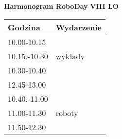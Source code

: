 \documentclass{article}
\begin{document}
\begin{center}
\Large\textbf{Harmonogram RoboDay}
\large\textbf{VIII LO}
\end{center}
\vspace{1cm}
\begin{center}
\begin{tabular}{|l|l|}
\hline
\textbf{Godzina} & \textbf{Wydarzenie} \\
\hline
10.00-10.15 &  \\
\hline
10.15.-10.30 & wykłady \\
\hline
10.30-10.40 &  \\
\hline
12.45-13.00 &  \\
\hline
10.40.-11.00 &  \\
\hline
11.00-11.30 & roboty \\
\hline
11.50-12.30 &  \\
\hline
\end{tabular}
\end{center}
\end{document}
